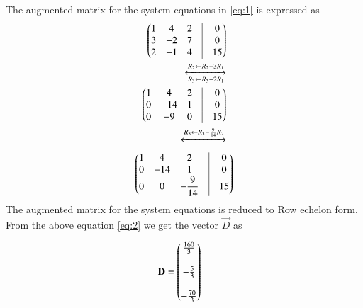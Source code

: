 \documentclass[journal,12pt,twocolumn]{IEEEtran}
\begin{document}
\begin{enumerate}
The augmented matrix for the system equations in \eqref{eq:1} is expressed as
\begin{align}
	\myvec{1&4&2&\vrule&0\\ 3&-2&7&\vrule&0 \\ 2&-1&4&\vrule&15} \\
	\xleftrightarrow[R_3\leftarrow R_3-2R_1]{R_2\leftarrow R_2-3R_1}\\
	\myvec{1&4&2&\vrule&0\\ 0&-14&1&\vrule&0 \\ 0&-9&0&\vrule&15}\\
	\xleftrightarrow[]{R_3\leftarrow R_3-\frac{9}{14}R_2}
\end{align}
\begin{align}
	\label{eq:2}
	\myvec{1&4&2&\vrule&0\\ 0&-14&1&\vrule&0 \\ 0&0&-\dfrac{9}{14}&\vrule&15}
\end{align}
The augmented matrix for the system equations is reduced to Row echelon form, From the above equation \ref{eq:2} we get the vector $\vec{D}$ as

\begin{align}
\mathbf{D} &= \begin{pmatrix}\frac{160}{3}\\\\ -\frac{5}{3}\\\\-\frac{70}{3}\end{pmatrix}
\end{align}

\end{enumerate}
\end{document}
